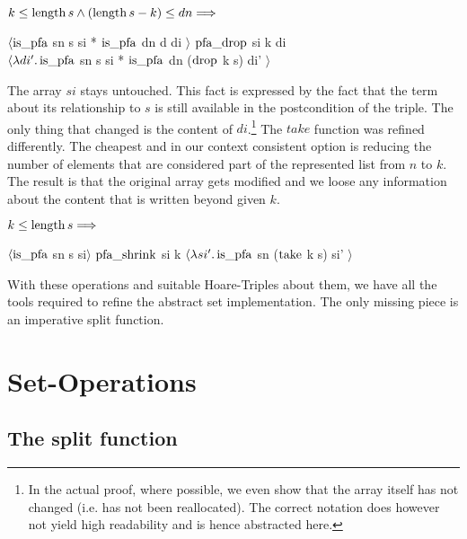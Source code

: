 \begin{lemma}
    $k \le \operatorname{length} s \wedge (\operatorname{length} s - k) \le dn \Longrightarrow$ \\
    \begin{center}
    $\langle \operatorname{is\_pfa}$ sn s si * $\operatorname{is\_pfa}$ dn d di $\rangle$
    $\operatorname{pfa\_drop}$ si k di \\
    $\langle\lambda di'. \operatorname{is\_pfa}$ sn s si * $\operatorname{is\_pfa}$ dn ($\operatorname{drop}$ k s) di' $\rangle$
    \end{center}
\end{lemma}

The array $si$ stays untouched.
This fact is expressed by the fact that the term about its relationship to $s$
is still available in the postcondition of the triple.
The only thing that changed is the content of $di$.\footnote{
    In the actual proof, where possible, we even show that the array itself has not changed
    (i.e. has not been reallocated).
    The correct notation does however not yield high readability
    and is hence abstracted here.
}
The $take$ function was refined differently.
The cheapest and in our context consistent option is
reducing the number of elements that are considered part of the represented list
from $n$ to $k$.
The result is that the original array gets modified and we loose any information
about the content that is written beyond given $k$.

\begin{lemma}
    $k \le \operatorname{length} s\Longrightarrow$ \\
    \begin{center}
    $\langle \operatorname{is\_pfa}$ sn s si$\rangle$
    $\operatorname{pfa\_shrink}$ si k
    $\langle\lambda si'. \operatorname{is\_pfa}$ sn ($\operatorname{take}$ k s) si' $\rangle$
    \end{center}
\end{lemma}

With these operations and suitable Hoare-Triples about them,
we have all the tools required to refine the abstract set implementation.
The only missing piece is an imperative split function.

\section{Set-Operations}

\subsection{The split function}

